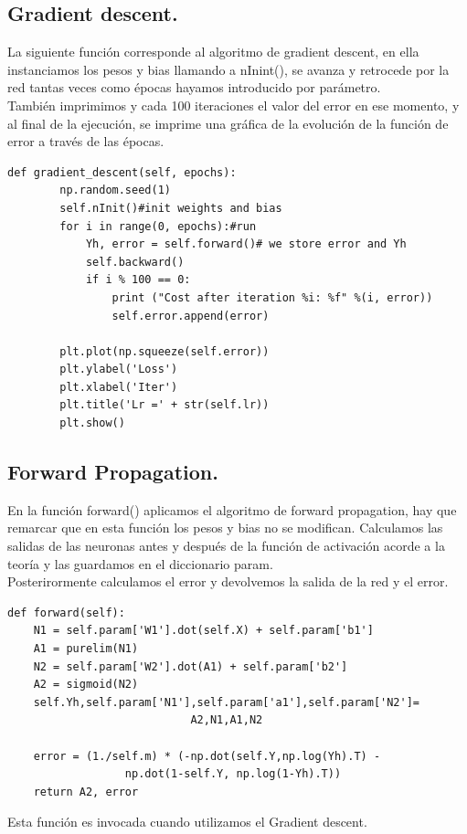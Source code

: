 \documentclass[a4paper,10pt]{article}
\begin{document}
\subsection{Gradient descent.}

La siguiente función corresponde al algoritmo de gradient descent, en ella instanciamos los pesos y bias llamando a nInint(), se avanza y retrocede por la red tantas veces como épocas hayamos introducido por parámetro. \\También imprimimos y cada 100 iteraciones el valor del error en ese momento, y al final de la ejecución, se imprime una gráfica de la evolución de la función de error a través de las épocas.
\begin{lstlisting}
def gradient_descent(self, epochs):
        np.random.seed(1)                         
        self.nInit()#init weights and bias
        for i in range(0, epochs):#run
            Yh, error = self.forward()# we store error and Yh
            self.backward()
            if i % 100 == 0:
                print ("Cost after iteration %i: %f" %(i, error)) 
                self.error.append(error) 

        plt.plot(np.squeeze(self.error))
        plt.ylabel('Loss')
        plt.xlabel('Iter')
        plt.title('Lr =' + str(self.lr))
        plt.show()        

\end{lstlisting}
\subsection{Forward Propagation.}

En la función forward() aplicamos el algoritmo de forward propagation, hay que remarcar que en esta función los pesos y bias no se modifican. Calculamos las salidas de las neuronas antes y después de la función de activación acorde a la teoría y las guardamos en el diccionario param.\\ Posterirormente calculamos el error y devolvemos la salida de la red y el error.
\begin{lstlisting}
def forward(self):
    N1 = self.param['W1'].dot(self.X) + self.param['b1']
    A1 = purelim(N1)
    N2 = self.param['W2'].dot(A1) + self.param['b2']
    A2 = sigmoid(N2)
    self.Yh,self.param['N1'],self.param['a1'],self.param['N2']=
						    A2,N1,A1,N2

    error = (1./self.m) * (-np.dot(self.Y,np.log(Yh).T) - 
			      np.dot(1-self.Y, np.log(1-Yh).T))
    return A2, error
\end{lstlisting}
Esta función es invocada cuando utilizamos el Gradient descent.
\end{document}
